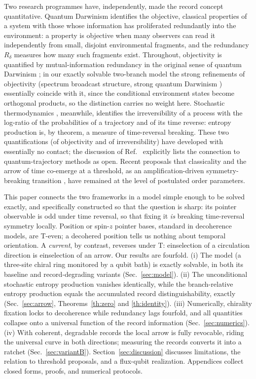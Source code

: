\documentclass[11pt]{article}
\begin{document}
Two research programmes have, independently, made the record concept quantitative. Quantum Darwinism \cite{Zurek2009,Riedel2012,Zurek2022} identifies the objective, classical properties of a system with those whose information has proliferated redundantly into the environment: a property is objective when many observers can read it independently from small, disjoint environmental fragments, and the redundancy $R_\delta$ measures how many such fragments exist. Throughout, objectivity is quantified by mutual-information redundancy in the original sense of quantum Darwinism \cite{Ollivier2004,Zurek2009}; in our exactly solvable two-branch model the strong refinements of objectivity (spectrum broadcast structure, strong quantum Darwinism \cite{Korbicz2021,Le2019}) essentially coincide with it, since the conditional environment states become orthogonal products, so the distinction carries no weight here. Stochastic thermodynamics \cite{Maes2003,Callens2004,Landi2021}, meanwhile, identifies the irreversibility of a process with the log-ratio of the probabilities of a trajectory and of its time reverse: entropy production is, by theorem, a measure of time-reversal breaking. These two quantifications (of objectivity and of irreversibility) have developed with essentially no contact; the discussion of Ref.~\cite{Riedel2012} explicitly lists the connection to quantum-trajectory methods as open. Recent proposals that classicality and the arrow of time co-emerge at a threshold, as an amplification-driven symmetry-breaking transition \cite{Aharonov2000}, have remained at the level of postulated order parameters.

This paper connects the two frameworks in a model simple enough to be solved exactly, and specifically constructed so that the question is sharp: its pointer observable is odd under time reversal, so that fixing it \emph{is} breaking time-reversal symmetry locally. Position or spin-$z$ pointer bases, standard in decoherence models, are T-even; a decohered position tells us nothing about temporal orientation. A \emph{current}, by contrast, reverses under T: einselection of a circulation direction is einselection of an arrow. Our results are fourfold. (i) The model (a three-site chiral ring monitored by a qubit bath) is exactly solvable, in both its baseline and record-degrading variants (Sec.~\ref{sec:model}). (ii) The unconditional stochastic entropy production vanishes identically, while the branch-relative entropy production equals the accumulated record distinguishability, exactly (Sec.~\ref{sec:arrow}, Theorems~\ref{th:zero} and \ref{th:identity}). (iii) Numerically, chirality fixation locks to decoherence while redundancy lags fourfold, and all quantities collapse onto a universal function of the record information (Sec.~\ref{sec:numerics}). (iv) With coherent, degradable records the local arrow is fully revocable, riding the universal curve in both directions; measuring the records converts it into a ratchet (Sec.~\ref{sec:variantB}). Section~\ref{sec:discussion} discusses limitations, the relation to threshold proposals, and a flux-qubit realization. Appendices collect closed forms, proofs, and numerical protocols.
\end{document}
